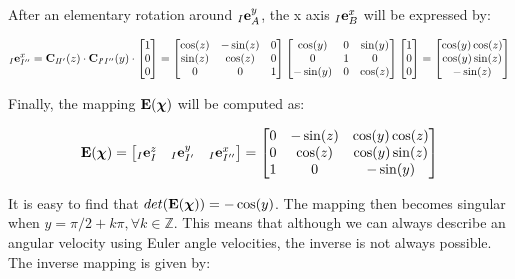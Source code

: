 \documentclass[10pt,landscape,a4paper]{article}
\newcommand\comat[2]{\vC_{#1\!#2}}
\begin{document}
\begin{multicols}{2}
After an elementary rotation around ${}_I \mathbf e^y_A$, the x axis ${}_I \mathbf e^x_B$ will be expressed by:

\begin{equation}
{}_I \ve^x_{I''} = 
\comat{I}{I'}(z) \cdot \comat{I}{'I''}(y)
\cdot
\begin{bmatrix}
1 \\ 0 \\ 0
\end{bmatrix}
=
\begin{bmatrix}
\cos(z) & -\sin(z) 	& 0 \\ 
\sin(z) &  \cos(z) 	& 0 \\ 
0	 	& 0 		& 1
\end{bmatrix}
\begin{bmatrix}
\cos(y) 	& 	0 	& \sin(y)	\\ 
0 			&  	1 	& 0 		\\ 
-\sin(y) 	& 	0 	& \cos(z)
\end{bmatrix}
\begin{bmatrix}
1 \\ 0 \\ 0
\end{bmatrix}
=
\begin{bmatrix}
\cos(y)\cos(z) \\ \cos(y)\sin(z) \\ -\sin(z)
\end{bmatrix}
\end{equation}

Finally, the mapping $\mathbf E(\mbox{\boldmath $\chi$})$ will be computed as:

\begin{equation}
\mathbf E(\mbox{\boldmath $\chi$}) =
\begin{bmatrix}
{}_I \mathbf e^z_I & {}_I \mathbf e^y_{I'} & {}_I \mathbf e^x_{I''}
\end{bmatrix}
=
\begin{bmatrix}
0 & -\sin(z) 	& \cos(y)\cos(z) \\
0 &  \cos(z) 	& \cos(y)\sin(z) \\
1 &  0			& -\sin(y)		 \\
\end{bmatrix}
\end{equation}

It is easy to find that $det(\mathbf E(\mbox{\boldmath $\chi$})) = -\cos(y)$. The mapping then becomes singular when $y = \pi/2 + k\pi, \forall k \in \mathbb{Z}$. This means that although we can always describe an angular velocity using Euler angle velocities, the inverse is not always possible. The inverse mapping is given by:


\end{multicols}
\end{document}
